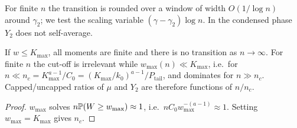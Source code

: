 \begin{remark}
For finite $n$ the transition is rounded over a window of width $O(1/\log n)$
around $\gamma_2$; we test the scaling variable $(\gamma-\gamma_2)\log n$. In the condensed phase
$Y_2$ does not self-average.
\end{remark}

\begin{proposition}
If $w\le K_{\max}$, all moments are finite and there is no transition as $n\to\infty$.
For finite $n$ the cut-off is irrelevant while $w_{\max}(n)\ll K_{\max}$, i.e.\ for
$n\ll n_c=K_{\max}^{a-1}/C_0=(K_{\max}/k_0)^{a-1}/P_{\mathrm{tail}}$, and dominates for $n\gg n_c$.
Capped/uncapped ratios of $\mu$ and $Y_2$ are therefore functions of $n/n_c$.
\end{proposition}
\begin{proof}
$w_{\max}$ solves $n\mathbb{P}(W\ge w_{\max})\approx1$, i.e.\ $nC_0w_{\max}^{-(a-1)}\approx1$. Setting
$w_{\max}=K_{\max}$ gives $n_c$.
\end{proof}

